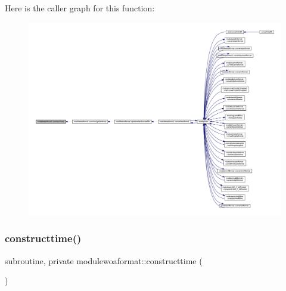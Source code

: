 Here is the caller graph for this function\+:\nopagebreak
\begin{figure}[H]
\begin{center}
\leavevmode
\includegraphics[width=350pt]{namespacemodulewoaformat_a5db9ab670b36026be5980f95935f64f6_icgraph}
\end{center}
\end{figure}
\mbox{\label{namespacemodulewoaformat_a99ab25469c7485e8abd999389b55602e}} 
\subsubsection{\texorpdfstring{constructtime()}{constructtime()}}
{\footnotesize\ttfamily subroutine, private modulewoaformat\+::constructtime (\begin{DoxyParamCaption}{ }\end{DoxyParamCaption})\hspace{0.3cm}{\ttfamily [private]}}

